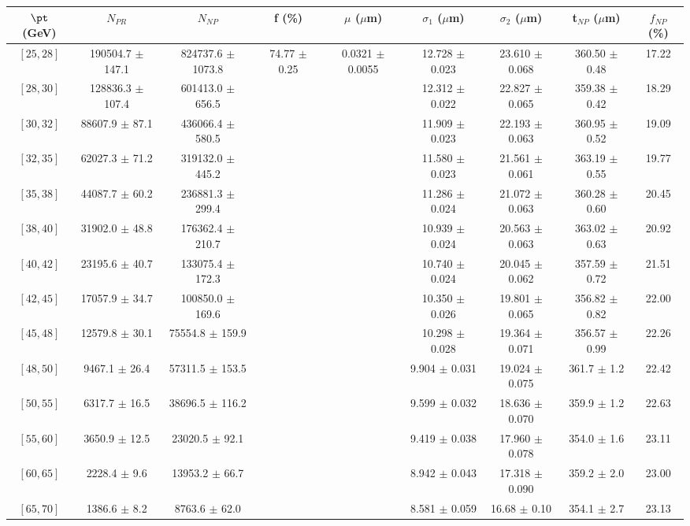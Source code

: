 \begin{tabular}{c||c|c|c|c|c|c|c||c}
$\pt$ (GeV) & $N_{PR}$ & $N_{NP}$ & f (\%) & $\mu$ ($\mu$m) & $\sigma_1$ ($\mu$m) & $\sigma_2$ ($\mu$m)  & t$_{NP}$ ($\mu$m) & $f_{NP}$ (\%) \\
\hline
$[25, 28]$ & 190504.7 $\pm$ 147.1 & 824737.6 $\pm$ 1073.8 & \multirow{19}{*}{74.77 $\pm$ 0.25} & \multirow{19}{*}{0.0321 $\pm$ 0.0055} & 12.728 $\pm$ 0.023 & 23.610 $\pm$ 0.068 & 360.50 $\pm$ 0.48 & 17.22\\
$[28, 30]$ & 128836.3 $\pm$ 107.4 & 601413.0 $\pm$ 656.5 &  &  & 12.312 $\pm$ 0.022 & 22.827 $\pm$ 0.065 & 359.38 $\pm$ 0.42 & 18.29\\
$[30, 32]$ & 88607.9 $\pm$ 87.1 & 436066.4 $\pm$ 580.5 &  &  & 11.909 $\pm$ 0.023 & 22.193 $\pm$ 0.063 & 360.95 $\pm$ 0.52 & 19.09\\
$[32, 35]$ & 62027.3 $\pm$ 71.2 & 319132.0 $\pm$ 445.2 &  &  & 11.580 $\pm$ 0.023 & 21.561 $\pm$ 0.061 & 363.19 $\pm$ 0.55 & 19.77\\
$[35, 38]$ & 44087.7 $\pm$ 60.2 & 236881.3 $\pm$ 299.4 &  &  & 11.286 $\pm$ 0.024 & 21.072 $\pm$ 0.063 & 360.28 $\pm$ 0.60 & 20.45\\
$[38, 40]$ & 31902.0 $\pm$ 48.8 & 176362.4 $\pm$ 210.7 &  &  & 10.939 $\pm$ 0.024 & 20.563 $\pm$ 0.063 & 363.02 $\pm$ 0.63 & 20.92\\
$[40, 42]$ & 23195.6 $\pm$ 40.7 & 133075.4 $\pm$ 172.3 &  &  & 10.740 $\pm$ 0.024 & 20.045 $\pm$ 0.062 & 357.59 $\pm$ 0.72 & 21.51\\
$[42, 45]$ & 17057.9 $\pm$ 34.7 & 100850.0 $\pm$ 169.6 &  &  & 10.350 $\pm$ 0.026 & 19.801 $\pm$ 0.065 & 356.82 $\pm$ 0.82 & 22.00\\
$[45, 48]$ & 12579.8 $\pm$ 30.1 & 75554.8 $\pm$ 159.9 &  &  & 10.298 $\pm$ 0.028 & 19.364 $\pm$ 0.071 & 356.57 $\pm$ 0.99 & 22.26\\
$[48, 50]$ & 9467.1 $\pm$ 26.4 & 57311.5 $\pm$ 153.5 &  &  & 9.904 $\pm$ 0.031 & 19.024 $\pm$ 0.075 & 361.7 $\pm$ 1.2 & 22.42\\
$[50, 55]$ & 6317.7 $\pm$ 16.5 & 38696.5 $\pm$ 116.2 &  &  & 9.599 $\pm$ 0.032 & 18.636 $\pm$ 0.070 & 359.9 $\pm$ 1.2 & 22.63\\
$[55, 60]$ & 3650.9 $\pm$ 12.5 & 23020.5 $\pm$ 92.1 &  &  & 9.419 $\pm$ 0.038 & 17.960 $\pm$ 0.078 & 354.0 $\pm$ 1.6 & 23.11\\
$[60, 65]$ & 2228.4 $\pm$ 9.6 & 13953.2 $\pm$ 66.7 &  &  & 8.942 $\pm$ 0.043 & 17.318 $\pm$ 0.090 & 359.2 $\pm$ 2.0 & 23.00\\
$[65, 70]$ & 1386.6 $\pm$ 8.2 & 8763.6 $\pm$ 62.0 &  &  & 8.581 $\pm$ 0.059 & 16.68 $\pm$ 0.10 & 354.1 $\pm$ 2.7 & 23.13\\

\end{tabular}
